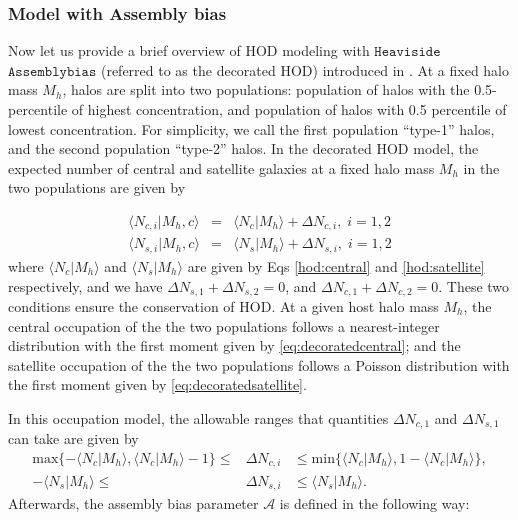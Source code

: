 \documentclass[twocolumn]{aastex61}
\begin{document}
\subsubsection{Model with Assembly bias}\label{subsubsec:decorated}
Now let us provide a brief overview of HOD modeling with $\mathtt{Heaviside}$ $\mathtt{Assemblybias}$ (referred to as the decorated HOD) introduced in \citet{decorated}. At a fixed halo mass $M_{h}$, halos are split into two populations: population of halos with the 0.5-percentile of highest concentration, and population of halos with 0.5 percentile of lowest concentration. For simplicity, we call the first population ``type-1'' halos, and the second population ``type-2'' halos. In the decorated HOD model, the expected number of central and satellite galaxies at a fixed halo mass $M_{h}$ in the two populations are given by

\begin{eqnarray}
\langle N_{c,i} | M_{h},c\rangle &=& \langle N_{c} | M_{h}\rangle + \Delta N _{c,i}, \; i=1,2 \label{eq:decoratedcentral} \\
\langle N_{s,i} | M_{h},c\rangle &=& \langle N_{s} | M_{h}\rangle + \Delta N _{s,i}, \; i=1,2 \label{eq:decoratedsatellite}
\end{eqnarray}
where $\langle N_{c} | M_{h}\rangle$ and $\langle N_{s} | M_{h}\rangle$ are given by Eqs \ref{hod:central} and \ref{hod:satellite} respectively, and we have $\Delta N_{s,1} + \Delta N_{s,2} = 0$, and $\Delta N_{c,1} + \Delta N_{c,2} = 0$. These two conditions ensure the conservation of HOD. At a given host halo mass $M_{h}$, the central occupation of the the two populations follows a nearest-integer distribution with the first moment given by \ref{eq:decoratedcentral}; and the satellite occupation of the the two populations follows a Poisson distribution with the first moment given by \ref{eq:decoratedsatellite}.

In this occupation model, the allowable ranges that quantities $\Delta N_{c,1}$ and $\Delta N_{s,1}$ can take are given by 
\begin{eqnarray}
\mathrm{max} \{-\langle N_{c} | M_{h}\rangle, \langle N_{c} | M_{h}\rangle -1 \} \leq &\Delta N_{c,i}& \leq \mathrm{min} \{\langle N_{c} | M_{h}\rangle, 1-\langle N_{c} | M_{h}\rangle\}
 , \label{eq:cen-bounds} \\
-\langle N_{s} | M_{h}\rangle \leq & \Delta N_{s,i}& \leq \langle N_{s} | M_{h}\rangle. \label{eq:sat-bounds}
\end{eqnarray}
Afterwards, the assembly bias parameter $\mathcal{A}$ is defined in the following way:
\end{document}
